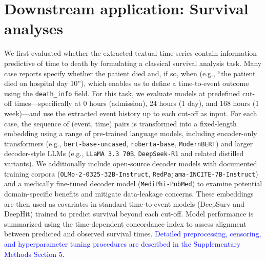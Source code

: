 \documentclass[pdflatex,sn-mathphys-num]{sn-jnl}%
\theoremstyle{thmstyleone}%
\theoremstyle{thmstyletwo}%
\theoremstyle{thmstylethree}%
\begin{document}

\section{Downstream application: Survival analyses}

We first evaluated whether the extracted textual time series contain information predictive of time to death by formulating a classical survival analysis task. Many case reports specify whether the patient died and, if so, when (e.g., ``the patient died on hospital day 10''), which enables us to define a time-to-event outcome using the \texttt{death\_info} field. For this task, we evaluate models at predefined cut-off times—specifically at 0 hours (admission), 24 hours (1 day), and 168 hours (1 week)—and use the extracted event history up to each cut-off as input. For each case, the sequence of (event, time) pairs is transformed into a fixed-length embedding using a range of pre-trained language models, including encoder-only transformers (e.g., \texttt{bert-base-uncased}, \texttt{roberta-base}, \texttt{ModernBERT}) and larger decoder-style LLMs (e.g., \texttt{LLaMA 3.3 70B}, \texttt{DeepSeek-R1} and related distilled variants). We additionally include open-source decoder models with documented training corpora (\texttt{OLMo-2-0325-32B-Instruct}, \texttt{RedPajama-INCITE-7B-Instruct}) and a medically fine-tuned decoder model (\texttt{MediPhi-PubMed}) to examine potential domain-specific benefits and mitigate data-leakage concerns. These embeddings are then used as covariates in standard time-to-event models (DeepSurv and DeepHit) trained to predict survival beyond each cut-off. Model performance is summarized using the time-dependent concordance index to assess alignment between predicted and observed survival times. \textcolor{blue}{Detailed preprocessing, censoring, and hyperparameter tuning procedures are described in the Supplementary Methods Section 5.}

%
\end{document}
